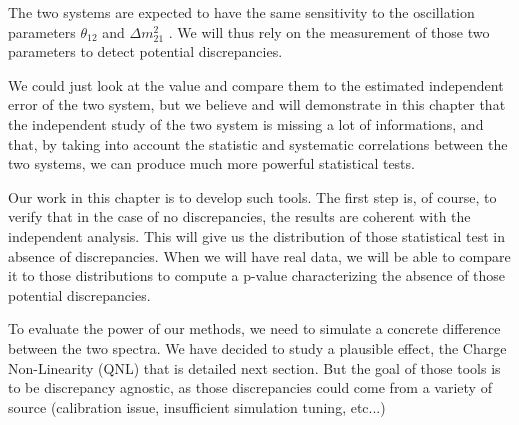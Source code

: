 \documentclass[../main.tex]{subfiles}
\begin{document}
The two systems are expected to have the same sensitivity to the oscillation parameters $\theta_{12}$ and $\Delta m^2_{21}$ \cite{juno_collaboration_sub-percent_2022}. We will thus rely on the measurement of those two parameters to detect potential discrepancies.

We could just look at the value and compare them to the estimated independent error of the two system, but we believe and will demonstrate in this chapter that the independent study of the two system is missing a lot of informations, and that, by taking into account the statistic and systematic correlations between the two systems, we can produce much more powerful statistical tests.

Our work in this chapter is to develop such tools. The first step is, of course, to verify that in the case of no discrepancies, the results are coherent with the independent analysis. This will give us the distribution of those statistical test in absence of discrepancies. When we will have real data, we will be able to compare it to those distributions to compute a p-value characterizing the absence of those potential discrepancies.

To evaluate the power of our methods, we need to simulate a concrete difference between the two spectra. We have decided to study a plausible effect, the Charge Non-Linearity (QNL) that is detailed next section. But the goal of those tools is to be discrepancy agnostic, as those discrepancies could come from a variety of source (calibration issue, insufficient simulation tuning, etc...)

%
%
%
%
%
%
\end{document}
